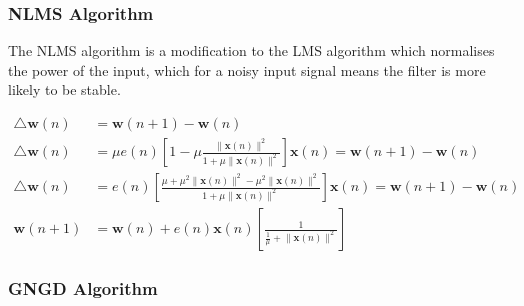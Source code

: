 \documentclass[./main.tex]{subfiles}
\begin{document}
\subsubsection{NLMS Algorithm}

The NLMS algorithm is a modification to the LMS algorithm which normalises the power of the input, which for a noisy input signal means the filter is more likely to be stable.

\begin{subequations}
	\begin{align}
	\bigtriangleup \mathbf{w}(n) &= \mathbf{w}(n+1) - \mathbf{w}(n) \\
	\bigtriangleup \mathbf{w}(n) &= \mu e(n) \left[  1 - \mu \frac{\lVert \mathbf{x}(n)\rVert^2}{1 + \mu \lVert \mathbf{x}(n)\rVert^2} \right] \mathbf{x}(n) = \mathbf{w}(n+1) - \mathbf{w}(n) \\
	\bigtriangleup \mathbf{w}(n) &= e(n) \left[ \frac{\mu + \mu^2  \lVert \mathbf{x}(n)\rVert^2 - \mu^2 \lVert \mathbf{x}(n)\rVert^2}{1 + \mu \lVert \mathbf{x}(n)\rVert^2} \right] \mathbf{x}(n) = \mathbf{w}(n+1) - \mathbf{w}(n) \\
	\mathbf{w}(n+1) &= \mathbf{w}(n) + e(n)  \mathbf{x}(n) \left[ \frac{1}{\frac{1}{\mu} + \lVert \mathbf{x}(n)\rVert^2 } \right]
	\end{align}
\end{subequations}

\subsubsection{GNGD Algorithm}




%  	


 		
\end{document}
